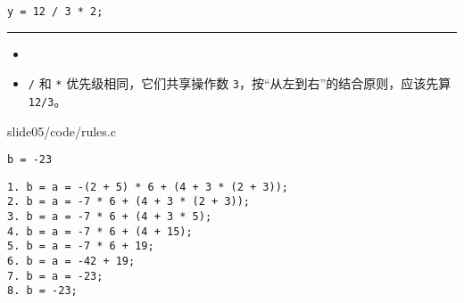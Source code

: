 \begin{frame}[fragile]\ft{\subsecname}
\begin{lstlisting}
y = 12 / 3 * 2;
\end{lstlisting}
\rule{\textwidth}{1mm}\pause 

\begin{itemize}
\item {}\\[0.1in]
\item  \lstinline|/| 和 \lstinline|*| 优先级相同，它们共享操作数 \lstinline|3|，按“从左到右”的结合原则，应该先算 \lstinline|12/3|。
\end{itemize}
\end{frame}

\begin{frame}[fragile]\ft{\subsecname}
  
  {slide05/code/rules.c} \pause 

\begin{lstlisting}[backgroundcolor=\color{red!10},basicstyle=\ttfamily\small] 
b = -23
\end{lstlisting} \pause 

\begin{lstlisting}[backgroundcolor=\color{red!10},basicstyle=\ttfamily\small]
1. b = a = -(2 + 5) * 6 + (4 + 3 * (2 + 3));
2. b = a = -7 * 6 + (4 + 3 * (2 + 3));
3. b = a = -7 * 6 + (4 + 3 * 5);
4. b = a = -7 * 6 + (4 + 15);
5. b = a = -7 * 6 + 19;
6. b = a = -42 + 19;
7. b = a = -23;
8. b = -23;
\end{lstlisting}
\end{frame}

